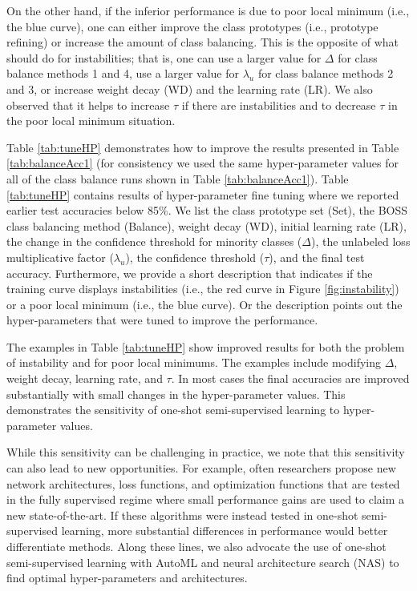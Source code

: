 \documentclass[final]{cvpr}
\newcommand{\OSSSL}{one-shot semi-supervised learning }
\newcommand{\OSSSLno}{one-shot semi-supervised learning}
\newcommand{\HP}{hyper-parameter }
\newcommand{\HPs}{hyper-parameters }
\begin{document}
On the other hand, if the inferior performance is due to poor local minimum (i.e., the blue curve), one can either improve the class prototypes (i.e., prototype refining) or increase the amount of class balancing.
This is the opposite of what should do for instabilities; that is, one can use a larger value for $ \Delta $ for class balance methods 1 and 4, use a larger value for $ \lambda_u $ for class balance methods 2 and 3, or increase weight decay (WD) and the learning rate (LR).
We also observed that it helps to increase $ \tau $ if there are instabilities and to decrease $ \tau $ in the poor local minimum situation.

Table \ref{tab:tuneHP} demonstrates how to improve the results presented in Table \ref{tab:balanceAcc1} (for consistency we used the same \HP values for all of the class balance runs shown in Table \ref{tab:balanceAcc1}).
Table \ref{tab:tuneHP} contains results of \HP fine tuning where we reported earlier test accuracies below 85\%.
We list the class prototype set (Set), the BOSS class balancing method (Balance), weight decay (WD), initial learning rate (LR), the change in the confidence threshold for minority classes ($\Delta$), the unlabeled loss multiplicative factor ($\lambda_u$), the confidence threshold ($\tau$), and the final test accuracy.
Furthermore, we provide a short description that indicates if the training curve displays instabilities (i.e., the red curve in Figure \ref{fig:instability}) or a poor local minimum (i.e., the blue curve).
Or the description points out the \HPs that were tuned to improve the performance.



The examples in Table \ref{tab:tuneHP} show improved results for both the problem of instability and for poor local minimums.
The examples include modifying $\Delta$, weight decay, learning rate, and $\tau$.
In most cases the final accuracies are improved substantially with small changes in the \HP values.
This demonstrates the sensitivity of \OSSSL to \HP values.

While this sensitivity can be challenging in practice, we note that this sensitivity can also lead to new opportunities.
For example, often researchers propose new network architectures, loss functions, and optimization functions that are tested in the fully supervised regime where small performance gains are used to claim a new state-of-the-art.
If these algorithms were instead tested in \OSSSLno, more substantial differences in performance would better differentiate methods.
Along these lines, we also advocate the use of \OSSSL with AutoML and neural architecture search (NAS) \cite{elsken2018neural} to find optimal hyper-parameters and architectures.
\end{document}
